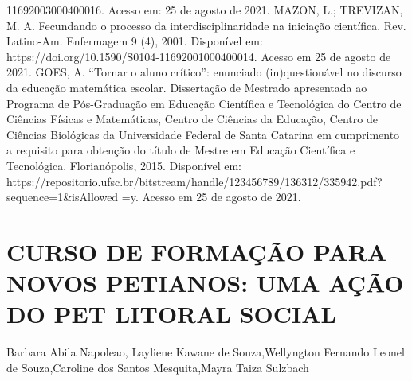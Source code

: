 11692003000400016. Acesso em: 25 de agosto de 2021.
MAZON, L.; TREVIZAN, M. A. Fecundando o processo da interdisciplinaridade na iniciação 
científica. Rev. Latino-Am. Enfermagem 9 (4), 2001. Disponível em: 
https://doi.org/10.1590/S0104-11692001000400014. Acesso em 25 de agosto de 2021.
GOES, A. “Tornar o aluno crítico”: enunciado (in)questionável no discurso da educação 
matemática escolar. Dissertação de Mestrado apresentada ao Programa de Pós-Graduação em 
Educação Científica e Tecnológica do Centro de Ciências Físicas e Matemáticas, Centro de Ciências 
da Educação, Centro de Ciências Biológicas da Universidade Federal de Santa Catarina em 
cumprimento a requisito para obtenção do título de Mestre em Educação Científica e Tecnológica. 
Florianópolis, 2015. Disponível em: 
https://repositorio.ufsc.br/bitstream/handle/123456789/136312/335942.pdf?sequence=1&isAllowed
=y. Acesso em 25 de agosto de 2021.



\section{CURSO DE FORMAÇÃO PARA NOVOS PETIANOS: UMA AÇÃO DO PET LITORAL  SOCIAL}

Barbara Abila Napoleao, Layliene Kawane de Souza,Wellyngton Fernando Leonel de  Souza,Caroline dos Santos Mesquita,Mayra Taiza Sulzbach

